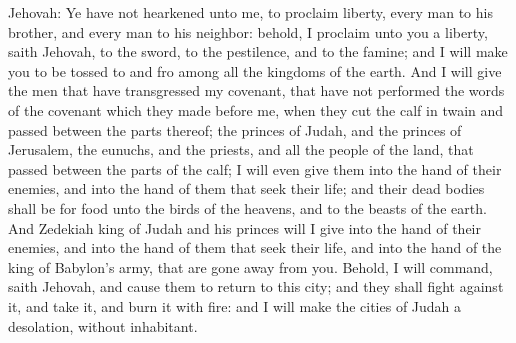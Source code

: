 Jehovah: Ye have not hearkened unto me, to proclaim liberty, every man to his brother, and every man to his neighbor: behold, I proclaim unto you a liberty, saith Jehovah, to the sword, to the pestilence, and to the famine; and I will make you to be tossed to and fro among all the kingdoms of the earth. And I will give the men that have transgressed my covenant, that have not performed the words of the covenant which they made before me, when they cut the calf in twain and passed between the parts thereof; the princes of Judah, and the princes of Jerusalem, the eunuchs, and the priests, and all the people of the land, that passed between the parts of the calf; I will even give them into the hand of their enemies, and into the hand of them that seek their life; and their dead bodies shall be for food unto the birds of the heavens, and to the beasts of the earth. And Zedekiah king of Judah and his princes will I give into the hand of their enemies, and into the hand of them that seek their life, and into the hand of the king of Babylon’s army, that are gone away from you. Behold, I will command, saith Jehovah, and cause them to return to this city; and they shall fight against it, and take it, and burn it with fire: and I will make the cities of Judah a desolation, without inhabitant. 

